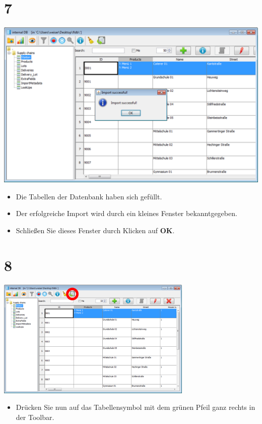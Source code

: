 \documentclass{beamer}
\begin{document}
\section{7}
\begin{frame}
	\begin{center}
  		\includegraphics[height=0.6\textheight]{7.png}
	\end{center}
	\begin{itemize}
		\item Die Tabellen der Datenbank haben sich gefüllt.
		\item Der erfolgreiche Import wird durch ein kleines Fenster  bekanntgegeben.
		\item Schließen Sie dieses Fenster durch Klicken auf \textbf{OK}.
	\end{itemize}
\end{frame}

\section{8}
\begin{frame}
	\begin{center}
  		\includegraphics[width=0.7\textwidth]{8.png}
	\end{center}
	\begin{itemize}
		\item Drücken Sie nun auf das Tabellensymbol mit dem grünen Pfeil ganz rechts in der Toolbar.
	\end{itemize}
\end{frame}
\end{document}
